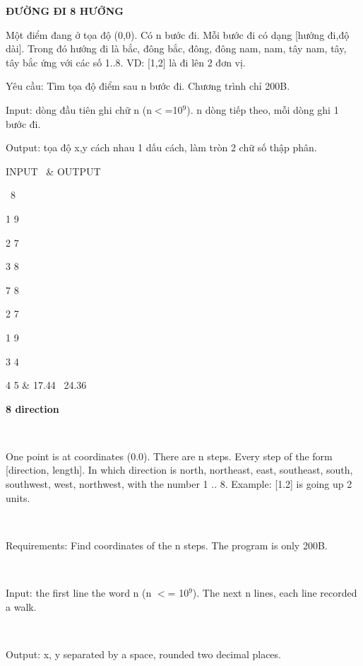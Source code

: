 

\textbf{ĐƯỜNG ĐI 8 HƯỚNG}

Một điểm đang ở tọa độ (0,0). Có n bước đi. Mỗi bước đi có dạng [hướng đi,độ dài]. Trong đó hướng đi là bắc, đông bắc, đông, đông nam, nam, tây nam, tây, tây bắc ứng với các số 1..8. VD: [1,2] là đi lên 2 đơn vị.

Yêu cầu: Tìm tọa độ điểm sau n bước đi. Chương trình chỉ 200B.

Input: dòng đầu tiên ghi chữ n (n$<$=10$^9$). n dòng tiếp theo, mỗi dòng ghi 1 bước đi.

Output: tọa độ x,y cách nhau 1 dấu cách, làm tròn 2 chữ số thập phân.
\begin{tabular}INPUT  & OUTPUT   


 8

1 9

2 7

3 8

7 8

2 7

1 9

3 4

4 5 & 17.44  24.36
\end{tabular}

\textbf{8 direction}

 

One point is at coordinates (0.0). There are n steps. Every step of the form [direction, length]. In which direction is north, northeast, east, southeast, south, southwest, west, northwest, with the number 1 .. 8. Example: [1.2] is going up 2 units.

 

Requirements: Find coordinates of the n steps. The program is only 200B.

 

Input: the first line the word n (n $<$= 10$^9$). The next n lines, each line recorded a walk.

 

Output: x, y separated by a space, rounded two decimal places.
